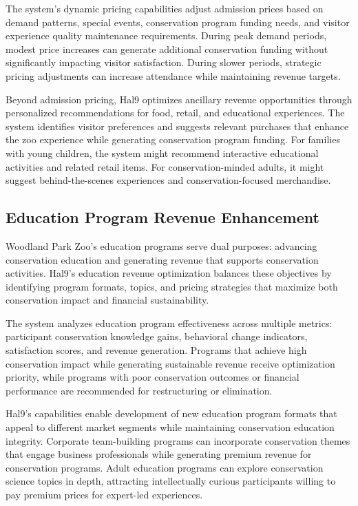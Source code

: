 \documentclass[
  Letterpaper,
]{scrbook}
\begin{document}
The system's dynamic pricing capabilities adjust admission prices based
on demand patterns, special events, conservation program funding needs,
and visitor experience quality maintenance requirements. During peak
demand periods, modest price increases can generate additional
conservation funding without significantly impacting visitor
satisfaction. During slower periods, strategic pricing adjustments can
increase attendance while maintaining revenue targets.

Beyond admission pricing, Hal9 optimizes ancillary revenue opportunities
through personalized recommendations for food, retail, and educational
experiences. The system identifies visitor preferences and suggests
relevant purchases that enhance the zoo experience while generating
conservation program funding. For families with young children, the
system might recommend interactive educational activities and related
retail items. For conservation-minded adults, it might suggest
behind-the-scenes experiences and conservation-focused merchandise.

\subsection{Education Program Revenue
Enhancement}\label{education-program-revenue-enhancement}

Woodland Park Zoo's education programs serve dual purposes: advancing
conservation education and generating revenue that supports conservation
activities. Hal9's education revenue optimization balances these
objectives by identifying program formats, topics, and pricing
strategies that maximize both conservation impact and financial
sustainability.

The system analyzes education program effectiveness across multiple
metrics: participant conservation knowledge gains, behavioral change
indicators, satisfaction scores, and revenue generation. Programs that
achieve high conservation impact while generating sustainable revenue
receive optimization priority, while programs with poor conservation
outcomes or financial performance are recommended for restructuring or
elimination.

Hal9's capabilities enable development of new education program formats
that appeal to different market segments while maintaining conservation
education integrity. Corporate team-building programs can incorporate
conservation themes that engage business professionals while generating
premium revenue for conservation programs. Adult education programs can
explore conservation science topics in depth, attracting intellectually
curious participants willing to pay premium prices for expert-led
experiences.
\end{document}
